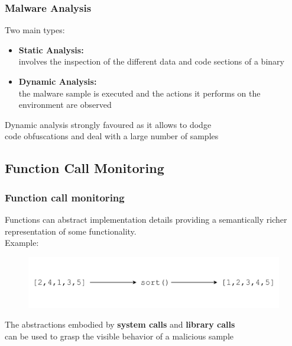 \documentclass[compress]{beamer}
\begin{document}
\begin{frame}
    \frametitle{Malware Analysis}

    Two main types:
    \medskip
    \begin{itemize}
        \item \textbf{Static Analysis:}\\
        involves the inspection of the different data and code sections of a binary
        \item \textbf{Dynamic Analysis:}\\
        the malware sample is executed and the actions it performs on the environment are observed
    \end{itemize}
    \vspace{1cm}    
        
         \begin{beamerboxesrounded}[shadow=true]{}
    Dynamic analysis strongly favoured as it allows to dodge \\ code obfuscations and deal with a large number of samples
    \end{beamerboxesrounded}    
 

\end{frame}

\subsection{Function Call Monitoring}
\begin{frame}
    \frametitle{Function call monitoring}

Functions can abstract
implementation details providing
a semantically richer representation of some functionality. \\\bigskip
Example:
    \begin{figure}
    	\vspace{-0.4cm}
        \includegraphics[scale=0.6]{image/fcmonitoring}
    \end{figure}

\begin{beamerboxesrounded}[shadow=true]{}
The abstractions embodied by \textbf{system calls} and \textbf{library calls} \\ can be used to grasp the visible behavior of a malicious sample
\end{beamerboxesrounded} 

\end{frame}
\end{document}
